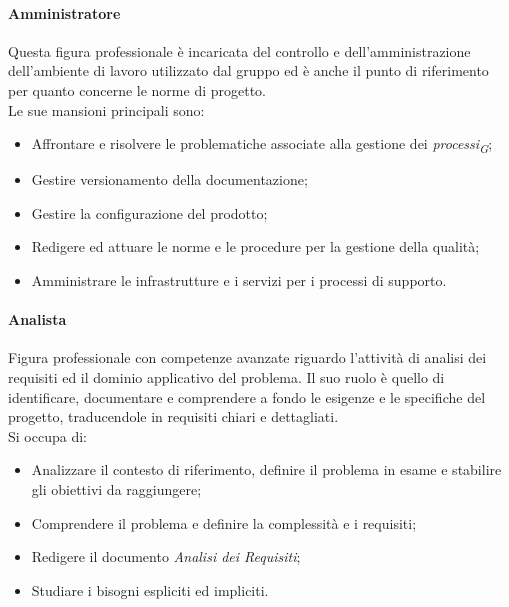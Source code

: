 \paragraph{Amministratore}\label{amministratore}Questa figura professionale è incaricata del controllo e dell'amministrazione dell'ambiente di lavoro utilizzato dal gruppo ed è anche il punto di riferimento per quanto concerne le norme di progetto. \\
Le sue mansioni principali sono:
\begin{itemize}
    \item Affrontare e risolvere le problematiche associate alla gestione dei \textit{processi}\textsubscript{\textit{G}};
    \item Gestire versionamento della documentazione;
    \item Gestire la configurazione del prodotto;
    \item Redigere ed attuare le norme e le procedure per la gestione della qualità;
    \item Amministrare le infrastrutture e i servizi per i processi di supporto.
\end{itemize}

\paragraph{Analista}\label{analista}Figura professionale con competenze avanzate riguardo l'attività di analisi dei requisiti ed il dominio applicativo del problema. Il suo ruolo è quello di identificare, documentare e comprendere a fondo le esigenze e le specifiche del progetto, traducendole in requisiti chiari e dettagliati. \\
Si occupa di:
\begin{itemize}
    \item Analizzare il contesto di riferimento, definire il problema in esame e stabilire gli obiettivi da raggiungere;
    \item Comprendere il problema e definire la complessità e i requisiti;
    \item Redigere il documento \textit{Analisi dei Requisiti};
    \item Studiare i bisogni espliciti ed impliciti.
\end{itemize}

